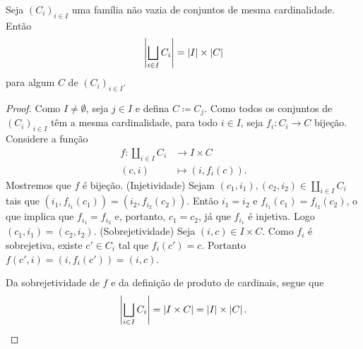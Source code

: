 \begin{prop}
\label{conj:prop.card.un.dis}
Seja $(C_i)_{i \in I}$ uma família não vazia de conjuntos de mesma cardinalidade. Então
	\begin{equation*}
	\left\vert{\bigsqcup_{i \in I} C_i}\right\vert = \left\vert{I}\right\vert \times \left\vert{C}\right\vert
	\end{equation*}
para algum $C$ de $(C_i)_{i \in I}$.
\end{prop}
\begin{proof}
Como $I \neq \emptyset$, seja $j \in I$ e defina $C \coloneqq C_j$. Como todos os conjuntos de $(C_i)_{i \in I}$ têm a mesma cardinalidade, para todo $i \in I$, seja $f_i: C_i \to C$ bijeção. Considere a função
	\begin{align*}
	f: \coprod_{i \in I} C_i &\to I \times C \\
			(c,i) &\mapsto (i,f_i(c)).
	\end{align*}
Mostremos que $f$ é bijeção. (Injetividade) Sejam $(c_1,i_1),(c_2,i_2) \in \coprod_{i \in I} C_i$ tais que $(i_1,f_{i_1}(c_1))=(i_2,f_{i_2}(c_2))$. Então $i_1=i_2$ e $f_{i_1}(c_1)=f_{i_2}(c_2)$, o que implica que $f_{i_1}=f_{i_2}$ e, portanto, $c_1=c_2$, já que $f_{i_1}$ é injetiva. Logo $(c_1,i_1)=(c_2,i_2)$. (Sobrejetividade) Seja $(i,c) \in I \times C$. Como $f_i$ é sobrejetiva, existe $c' \in C_i$ tal que $f_i(c')=c$. Portanto $f(c',i)=(i,f_i(c'))=(i,c)$.

Da sobrejetividade de $f$ e da definição de produto de cardinais, segue que
	\begin{equation*}
	\left\vert{\bigsqcup_{i \in I} C_i}\right\vert = \left\vert{I \times C}\right\vert = \left\vert{I}\right\vert \times \left\vert{C}\right\vert.
	\end{equation*}
\end{proof}

